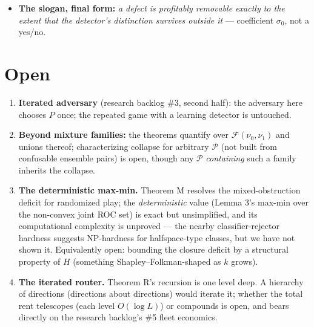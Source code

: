 \documentclass[11pt]{article}
\theoremstyle{plain}
\theoremstyle{definition}
\begin{document}
\begin{itemize}
  bound; textbooks \citealt{anthonybartlett1999}, \citealt{shalevshwartz2014}). Theorem E$'$'s
  \emph{problem} is Kalai--Kanade--Mansour's positive-reliable learning \citep{kalai2012} and its
  \emph{setup} is Neyman--Pearson classification at $\alpha = 0$ (\citealt{cannon2002};
  \citealt{scottnowak2005}; \citealt{rigollet2011}) --- cite both frames. Neither
  contains the zero-empirical-miss selection with the one-sided fast rate
  (KKM's reduction pays agnostic $\varepsilon^2$ rates; all NP papers run
  two-sided $\sqrt{\,}$ at $\alpha > 0$), nor the linear-vs-quadratic-in-$L$
  training bill --- which we present as an elementary corollary of the tight
  realizable/agnostic $1/\varepsilon$ vs $1/\varepsilon^2$ dichotomy (EHKV
  lower bound: \citealt{ehrenfeucht1989}), not a new phenomenon. Must engage: \citet{casacuberta2025},
  group-wise reliable abstention at agnostic rates --- owns
  the group-wise frame; lacks zero-miss certification, reweighting
  robustness, and the severity asymmetry.
\item \textbf{The slogan, final form:} \emph{a defect is profitably removable exactly to
  the extent that the detector's distinction survives outside it} ---
  coefficient $\sigma_0$, not a yes/no.
\end{itemize}

\section{Open}\label{app:open}

\begin{enumerate}
\item \textbf{Iterated adversary} (research backlog \#3, second half): the adversary here
   chooses $P$ once; the repeated game with a learning detector is untouched.
\item \textbf{Beyond mixture families:} the theorems quantify over
   $\mathcal{F}(\nu_0,\nu_1)$ and unions thereof; characterizing collapse for
   arbitrary $\mathcal{P}$ (not built from confusable ensemble pairs) is open,
   though any $\mathcal{P}$ \emph{containing} such a family inherits the collapse.
\item \textbf{The deterministic max-min.} Theorem M resolves the mixed-obstruction
   deficit for randomized play; the \emph{deterministic} value (Lemma 3's max-min
   over the non-convex joint ROC set) is exact but unsimplified, and its
   computational complexity is unproved --- the nearby classifier-rejector
   hardness \citep{mozannar2023} suggests NP-hardness for halfspace-type
   classes, but we have not shown it. Equivalently open: bounding the closure
   deficit by a structural property of $H$ (something Shapley--Folkman-shaped
   as $k$ grows).
\item \textbf{The iterated router.} Theorem R's recursion is one level deep. A
   hierarchy of directions (directions about directions) would iterate it;
   whether the total rent telescopes (each level $O(\log L)$) or compounds
   is open, and bears directly on the research backlog's \#5 fleet economics.
\end{enumerate}



\end{document}
